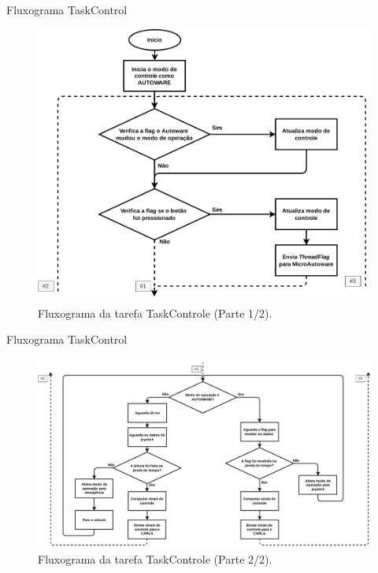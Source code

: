 \documentclass{if-beamer}
\begin{document}
\begin{frame}{Fluxograma TaskControl}

\begin{figure}[H]
	\centering
	\includegraphics[height= 0.8\textheight]{img/fluxograma_taskcontrol_1}
	\caption{Fluxograma da tarefa TaskControle (Parte 1/2).}
	\label{fig:fluxograma_taskcontrol_1}
\end{figure}

\end{frame}


\begin{frame}{Fluxograma TaskControl}



	\begin{figure}[H]
		\centering
		\includegraphics[height= 0.8\textheight]{img/fluxograma_taskcontrol_2}
		\caption{Fluxograma da tarefa TaskControle (Parte 2/2).}
		\label{fig:fluxograma_taskcontrol_2}
\end{figure}

\end{frame}
\end{document}
